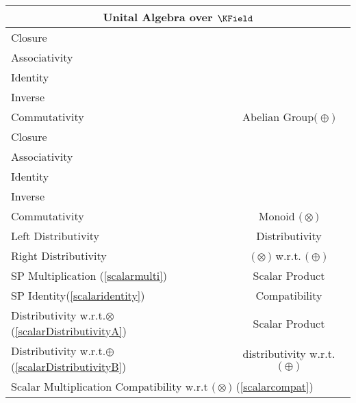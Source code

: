 \documentclass[a4paper,12pt]{scrartcl}    %
\newcommand{\OpA}{\otimes}
\newcommand{\OpB}{\oplus}
\begin{document}
\begin{minipage}[c]{0,5\textwidth}
\vspace{0.6cm}
\begin{tabular}{|l|c|} %
  \hline
  \multicolumn{2}{c}{\cellcolor{green!25}Unital Algebra over $\KField$} \\
  \hline
    \cellcolor{blue!25} \footnotesize Closure& \cellcolor{yellow!25}  \\
    \cellcolor{blue!25} \footnotesize Associativity& \cellcolor{yellow!25}  \\
    \cellcolor{blue!25} \footnotesize Identity& \cellcolor{yellow!25} \\
    \cellcolor{blue!25} \footnotesize Inverse& \cellcolor{yellow!25} \\
    \cellcolor{blue!25} \footnotesize Commutativity& \multirow{-5}{*}{\tiny\cellcolor{yellow!25}Abelian Group$\big(\OpB\big)$} \\
   \hline
    \cellcolor{blue!25} \footnotesize Closure& \cellcolor{yellow!25}  \\
    \cellcolor{blue!25} \footnotesize Associativity& \cellcolor{yellow!25}  \\
    \cellcolor{blue!25} \footnotesize Identity& \cellcolor{yellow!25} \\
    \cellcolor{red!25} \footnotesize Inverse& \cellcolor{yellow!25} \\
    \cellcolor{red!25} \footnotesize Commutativity& \multirow{-5}{*}{\tiny\cellcolor{yellow!25} Monoid $\big(\OpA\big)$} \\
  \hline
  	\cellcolor{blue!25} \footnotesize Left Distributivity&  \tiny\cellcolor{yellow!25}Distributivity\\
    \cellcolor{blue!25} \footnotesize Right Distributivity & \tiny\cellcolor{yellow!25} $\big(\OpA\big)$ w.r.t. $\big(\OpB\big)$  \\
   \hline
  \hline
     \cellcolor{blue!25} \footnotesize SP Multiplication (\ref{scalarmulti})&  \tiny\cellcolor{yellow!25}Scalar Product\\
    \cellcolor{blue!25} \footnotesize SP Identity(\ref{scalaridentity}) & \tiny\cellcolor{yellow!25} Compatibility  \\
   \hline 
    \cellcolor{blue!25} \footnotesize Distributivity w.r.t.$\OpA$ (\ref{scalarDistributivityA})&  \tiny\cellcolor{yellow!25}Scalar Product\\
    \cellcolor{blue!25} \footnotesize Distributivity w.r.t.$\OpB$ (\ref{scalarDistributivityB}) & \tiny\cellcolor{yellow!25} distributivity w.r.t. $\big(\OpB\big)$  \\
   \hline
    \multicolumn{2}{l}{\footnotesize \cellcolor{blue!25} Scalar Multiplication Compatibility w.r.t  $\big(\OpA\big)$ (\ref{scalarcompat})}\\
   \hline
\end{tabular}

\end{minipage}
\end{document}
